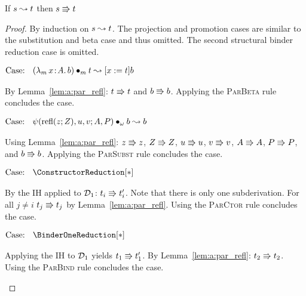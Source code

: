 \begin{lemma}
    If $s \leadsto t$ then $s \Rrightarrow t$
    \label{lem:a:beta_implies_par_step}
\end{lemma}
\begin{proof}
    By induction on $s \leadsto t$.
    The projection and promotion cases are similar to the substitution and beta case and thus omitted.
    The second structural binder reduction case is omitted.

    $\text{Case: }\begin{array}{c} ({\lambda_m}\, x\! : \! A.\, b) \bullet_{m} t \leadsto [x := t]b \end{array}$
    \begin{proofcase}
        By Lemma~\ref{lem:a:par_refl}: $t \Rrightarrow t$ and $b \Rrightarrow b$.
        Applying the \textsc{ParBeta} rule concludes the case.
    \end{proofcase}

    $\text{Case: }\begin{array}{c} \psi(\text{refl}(z; Z), u, v; A, P) \bullet_{\omega} b \leadsto b \end{array}$
    \begin{proofcase}
        Using Lemma~\ref{lem:a:par_refl}: $z \Rrightarrow z$, $Z \Rrightarrow Z$, $u \Rrightarrow u$, $v \Rrightarrow v$, $A \Rrightarrow A$, $P \Rrightarrow P$, and $b \Rrightarrow b$.
        Applying the \textsc{ParSubst} rule concludes the case.
    \end{proofcase}

    $\text{Case: }\begin{array}{c} \ConstructorReduction[*] \end{array}$
    \begin{proofcase}
        By the IH applied to $\mathcal{D}_{1}$: $t_i \Rrightarrow t_i^\prime$.
        Note that there is only one subderivation.
        For all $j \neq i$ $t_j \Rrightarrow t_j$ by Lemma~\ref{lem:a:par_refl}.
        Using the \textsc{ParCtor} rule concludes the case.
    \end{proofcase}

    $\text{Case: }\begin{array}{c} \BinderOneReduction[*] \end{array}$
    \begin{proofcase}
        Applying the IH to $\mathcal{D}_{1}$ yields $t_1 \Rrightarrow t_1^\prime$.
        By Lemma~\ref{lem:a:par_refl}: $t_2 \Rrightarrow t_2$.
        Using the \textsc{ParBind} rule concludes the case.
    \end{proofcase}
\end{proof}


